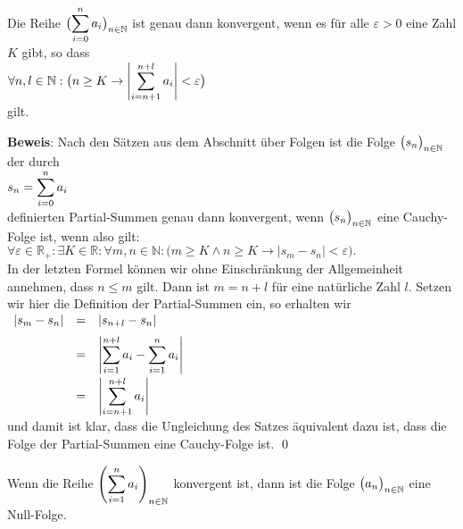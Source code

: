 \begin{Satz} 
Die Reihe $\displaystyle\bigl(\sum_{i=0}^{n} a_i\bigr)_{n\in\mathbb{N}}$ ist genau dann konvergent, wenn es f\"ur alle 
$\varepsilon>0$ eine Zahl $K$ gibt, so dass 
\\[0.2cm]
\hspace*{1.3cm}
$\displaystyle \forall n,l \in \mathbb{N}:\bigl( n \geq K \rightarrow \left|\sum\limits_{i=n+1}^{n+l} a_i \right| < \varepsilon\bigr)$ 
\\[0.2cm]
gilt.
\end{Satz}

\noindent
\textbf{Beweis}:  Nach den S\"atzen aus dem Abschnitt \"uber Folgen ist die Folge
$\bigl(s_n\bigr)_{n\in\mathbb{N}}$ der durch
\\[0.2cm]
\hspace*{1.3cm}
$\displaystyle s_n = \sum\limits_{i=0}^{n} a_i $
\\[0.2cm]
definierten Partial-Summen genau dann konvergent, wenn $\bigl(s_n\bigr)_{n\in\mathbb{N}}$ eine Cauchy-Folge
ist, wenn also gilt:
\\[0.2cm]
\hspace*{1.3cm}
$ \forall \varepsilon \in \mathbb{R}_+: \exists K \in \mathbb{R}: \forall m,n \in \mathbb{N}: 
   \bigl(m \geq K \wedge n \geq K \rightarrow \bigl| s_m - s_n \bigr| < \varepsilon\bigr).
$
\\[0.2cm]
In der letzten Formel k\"onnen wir ohne Einschr\"ankung der Allgemeinheit annehmen,
dass $n \leq m$ gilt.  Dann ist $m = n + l$ f\"ur eine nat\"urliche Zahl $l$.  Setzen wir hier
die Definition der Partial-Summen ein, so erhalten wir
\\[0.2cm]
\hspace*{1.3cm}
$ \begin{array}{lcl}
   \left| s_{m} - s_n \right| & = & \left| s_{n+l} - s_n \right| \\[0.2cm]
                              & = & \displaystyle \left| \sum\limits_{i=1}^{n+l} a_i - \sum\limits_{i=1}^n a_i \right| \\[0.4cm]
                              & = & \displaystyle \left| \sum\limits_{i=n+1}^{n+l} a_i \right| \\[0.2cm]
   \end{array}
$
\\[0.2cm]
und damit ist klar, dass die Ungleichung des Satzes \"aquivalent dazu ist,
dass die Folge der Partial-Summen eine Cauchy-Folge ist.
\qed

\begin{Korollar} \lb
Wenn die Reihe $\displaystyle\left(\sum\limits_{i=1}^n a_i\right)_{n\in\mathbb{N}}$ konvergent ist, dann ist die Folge $\bigl(a_n\bigr)_{n\in\mathbb{N}}$ eine Null-Folge.  
\end{Korollar}

